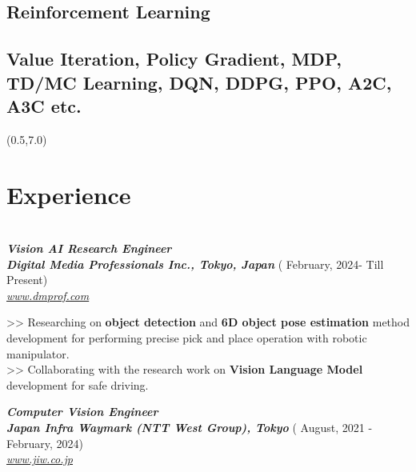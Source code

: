 \documentclass[article]{twentysecondcv_v2} %
\begin{document}
\begin{textblock}{8}
\section{\large Reinforcement Learning}\subsection{\small \textbf{Value Iteration, Policy Gradient, MDP, TD/MC Learning, DQN, DDPG, PPO, A2C, A3C
} etc. }


\end{textblock}


\begin{textblock}{12}(0.5,7.0)
\section{Experience}\\

{\bfseries \itshape \color{gray} Vision AI Research Engineer} \\
\textbf{\itshape \color{mainblue} Digital Media Professionals Inc., Tokyo, Japan }{\color{golden}  ( February, 2024- Till Present) }\\
{ \href {https://www.dmprof.com}{\itshape \color{blue} www.dmprof.com}}

\begin{multiline}
>> Researching on \textbf{object detection} and \textbf{6D object pose estimation} method development for performing precise pick and place operation with robotic manipulator.\\
>> Collaborating with the research work on \textbf{Vision Language Model} development for safe driving.
\end{multiline}

{\bfseries \itshape \color{gray} Computer Vision Engineer} \\
\textbf{\itshape \color{mainblue} Japan Infra Waymark (NTT West Group), Tokyo }{\color{golden}  ( August, 2021 - February, 2024) }\\
{ \href {https://www.jiw.co.jp}{\itshape \color{blue} www.jiw.co.jp}}


\end{textblock}
\end{document}
